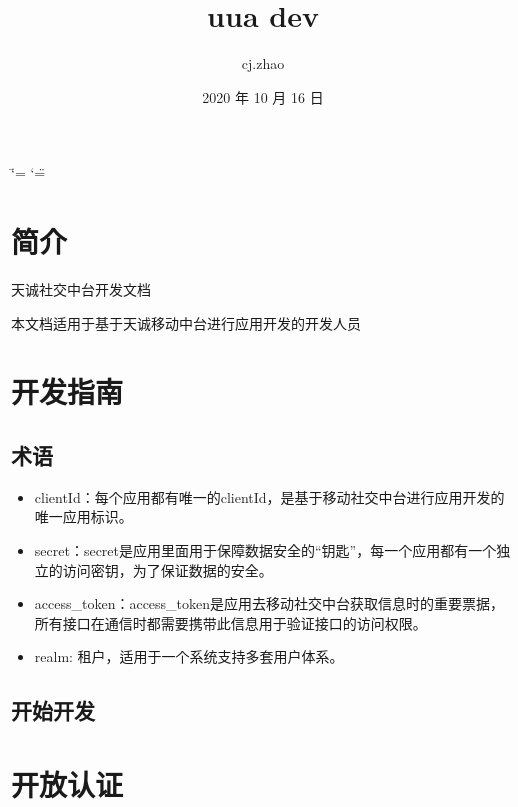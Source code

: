 \documentclass[a4paper,11pt,english]{sphinxmanual}
\title{uua dev}
\date{2020 年 10 月 16 日}
\author{cj.zhao}
\begin{document}
\ifdefined\shorthandoff
  \ifnum\catcode`\=\string=\active\shorthandoff{=}\fi
  \ifnum\catcode`\"=\active{}\fi
\fi

\pagestyle{empty}
\sphinxmaketitle
\pagestyle{plain}
\sphinxtableofcontents
\pagestyle{normal}
\label{\detokenize{index::doc}}



\chapter{简介}
\label{\detokenize{intro:id1}}\label{\detokenize{intro::doc}}
天诚社交中台开发文档

本文档适用于基于天诚移动中台进行应用开发的开发人员


\chapter{开发指南}
\label{\detokenize{dev-guide:id1}}\label{\detokenize{dev-guide::doc}}

\section{术语}
\label{\detokenize{dev-guide:id2}}\begin{itemize}
\item {} 
clientId：每个应用都有唯一的clientId，是基于移动社交中台进行应用开发的唯一应用标识。

\item {} 
secret：secret是应用里面用于保障数据安全的“钥匙”，每一个应用都有一个独立的访问密钥，为了保证数据的安全。

\item {} 
access\_token：access\_token是应用去移动社交中台获取信息时的重要票据，所有接口在通信时都需要携带此信息用于验证接口的访问权限。

\item {} 
realm: 租户，适用于一个系统支持多套用户体系。

\end{itemize}


\section{开始开发}
\label{\detokenize{dev-guide:id3}}

\chapter{开放认证}
\label{\detokenize{auth:id1}}\label{\detokenize{auth::doc}}
\end{document}
